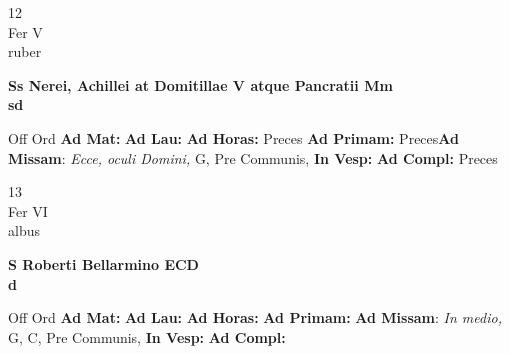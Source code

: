 \documentclass[10pt, openany]{book}
\begin{document}
    \begin{center}
        \begin{minipage}{3.5in}
            \vspace{2em}
            \begin{minipage}{0.5in}
                {\Huge 12} \\
                {\normalsize Fer V} \\
                {\normalsize ruber}
            \end{minipage}
            \begin{minipage}{3.0in}
                \textbf{ \large Ss Nerei, Achillei at Domitillae V atque Pancratii Mm \\
                \textnormal{\normalsize sd}} \\ 
            \end{minipage}
            \begin{justify}Off Ord
                \textbf{Ad Mat: }
                \textbf{Ad Lau: }
                \textbf{Ad Horas: }Preces
                \textbf{Ad Primam: }Preces\textbf{Ad Missam}: \textit{Ecce, oculi Domini,} G, Pre Communis,  
                \textbf{In Vesp: }
                \textbf{Ad Compl: }Preces
            \end{justify}
        \end{minipage}
    \end{center}

    \begin{center}
        \begin{minipage}{3.5in}
            \vspace{2em}
            \begin{minipage}{0.5in}
                {\Huge 13} \\
                {\normalsize Fer VI} \\
                {\normalsize albus}
            \end{minipage}
            \begin{minipage}{3.0in}
                \textbf{ \large S Roberti Bellarmino ECD \\
                \textnormal{\normalsize d}} \\ 
            \end{minipage}
            \begin{justify}Off Ord
                \textbf{Ad Mat: }
                \textbf{Ad Lau: }
                \textbf{Ad Horas: }
                \textbf{Ad Primam: }\textbf{Ad Missam}: \textit{In medio,} G, C, Pre Communis,  
                \textbf{In Vesp: }
                \textbf{Ad Compl: }
            \end{justify}
        \end{minipage}
    \end{center}
\end{document}
